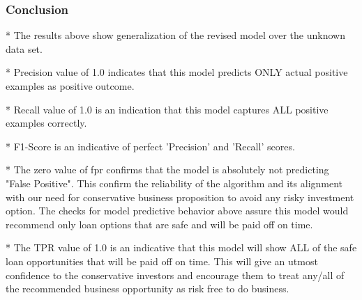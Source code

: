 \documentclass[11pt]{article}
\begin{document}
    \subsubsection{Conclusion}\label{conclusion}
* The results above show generalization of the revised model over the unknown data set. 

* Precision value of 1.0 indicates that this model predicts ONLY actual positive examples as positive outcome.

* Recall value of 1.0 is an indication that this model captures ALL positive examples correctly.

* F1-Score is an indicative of perfect 'Precision' and 'Recall' scores.

* The zero value of fpr confirms that the model is absolutely not predicting "False Positive". This confirm the reliability of the algorithm and its alignment with our need for conservative business proposition to avoid any risky investment option. The checks for model predictive behavior above assure this model would recommend only loan options that are safe and will be paid off on time.

* The TPR value of 1.0 is an indicative that this model will show ALL of the safe loan opportunities that will be paid off on time. This will give an utmost confidence to the conservative investors and encourage them to treat any/all of the recommended business opportunity as risk free to do business. 

    
    
    
    
\end{document}

